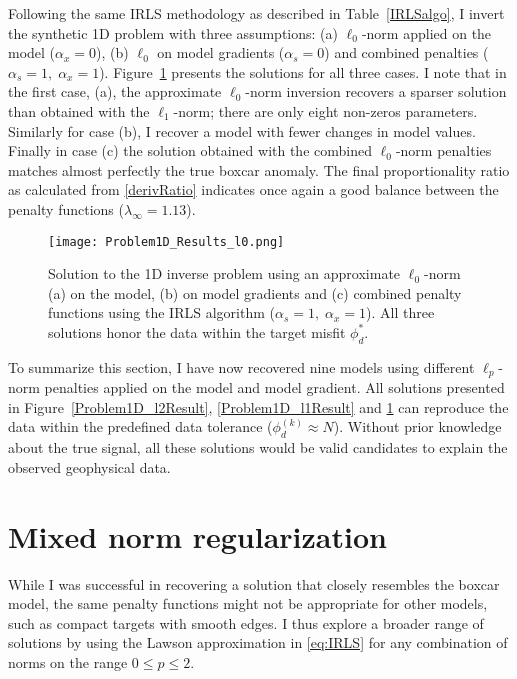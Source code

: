 Following the same IRLS methodology as described in Table~\ref{IRLSalgo}, I invert the synthetic 1D problem with three assumptions: (a) $\ell_0$-norm applied on the model ($\alpha_x = 0$), (b) $\ell_0$ on model gradients ($\alpha_s = 0$) and combined penalties ($\alpha_s=1,\;\alpha_x = 1$). Figure~\ref{Problem1D_l0Result} presents the solutions for all three cases. I note that in the first case, (a), the approximate $\ell_0$-norm inversion recovers a sparser solution than obtained with the $\ell_1$-norm; there are only eight non-zeros parameters. Similarly for case (b), I recover a model with fewer changes in model values. Finally in case (c) the solution obtained with the combined $\ell_0$-norm penalties matches almost perfectly the true boxcar anomaly. The final proportionality ratio as calculated from \eqref{derivRatio} indicates once again a good balance between the penalty functions ($\lambda_\infty = 1.13$).
\begin{figure}
\texttt{[image: Problem1D\_Results\_l0.png]}
\caption{Solution to the 1D inverse problem using an approximate $\ell_0$-norm (a) on the model, (b) on model gradients and (c) combined penalty functions using the IRLS algorithm ($\alpha_s=1,\;\alpha_x = 1$). All three solutions honor the data within the target misfit $\phi_d^*$.}
\label{Problem1D_l0Result}
\end{figure}

To summarize this section, I have now recovered nine models using different $\ell_p$-norm penalties applied on the model and model gradient. All solutions presented in Figure~\ref{Problem1D_l2Result}, \ref{Problem1D_l1Result} and \ref{Problem1D_l0Result} can reproduce the data within the predefined data tolerance ($\phi_d^{(k)} \approx N$). Without prior knowledge about the true signal, all these solutions would be valid candidates to explain the observed geophysical data.



\section{Mixed norm regularization}
While I was successful in recovering a solution that closely resembles the boxcar model, the same penalty functions might not be appropriate for other models, such as compact targets with smooth edges. I thus explore a broader range of solutions by using the Lawson approximation in \eqref{eq:IRLS} for any combination of norms on the range $0 \leq p \leq 2$.

